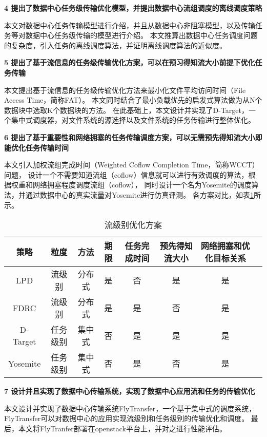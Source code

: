 \textbf{4 提出了数据中心任务级传输优化模型，并提出数据中心流组调度的离线调度策略}


本文对数据中心任务传输模型进行介绍，并且从数据中心非阻塞模型，以及传输任务等对数据中心任务级传输的模型进行介绍。
本文推算出数据中心任务调度问题的复杂度，引入任务的离线调度算法，并证明离线调度算法的近似度。


\textbf{5 提出了基于流信息的任务级传输优化方案，可以在预习得知流大小前提下优化任务传输}

本文提出基于流信息的任务级传输优化方法来最小化文件平均访问时间（File Access Time，简称FAT）。
本文同时结合了最小负载优先的启发式算法做为从N个数据块中选取K个数据块的方法。
在此基础上，本文设计并实现了D-Target，一个集中式调度器，对文件系统的源选择以及文件系统的任务传输进行整体优化。


\textbf{6 提出了基于重要性和网络拥塞的任务传输调度方案，可以无需预先得知流大小即能优化任务传输时间}


本文引入加权流组完成时间（Weighted Coflow Completion Time，简称WCCT）问题，
设计一个不需要知道流组（coflow）信息就可以进行有效调度的算法，根据权重和网络拥塞程度调度流组（coflow），
同时设计一个名为Yosemite的调度算法，并通过数据中心的真实流量对Yosemite进行仿真评测。
各方案对比，如表\ref{compare}所示。

\begin{table}[h]
\centering
\caption{流级别优化方案}\label{compare}
\renewcommand{\arraystretch}{1.5}
\begin{tabular}{|c|c|c|c|c|c|c|c|} \hline
\setlength{\tabcolsep}{10pt}
策略& 粒度 & 方法&期限&任务完成时间&预先得知流大小&网络拥塞和优化目标关系\\ \hline
LPD &流级别&分布式&是&否&是& 是\\ \hline
FDRC &流级别&分布式&是&是&否& 是\\ \hline
D-Target &任务级别&集中式&否&是&是& 是\\ \hline
Yosemite &任务级别&集中式&否&是&否& 是\\ \hline
\end{tabular}
\end{table}






\textbf{7 设计并且实现了数据中心传输系统，实现了数据中心应用流和任务的传输优化}


本文设计并实现了数据中心传输系统FlyTransfer，一个基于集中式的调度系统，
FlyTransfer可以对数据中心的应用实现流级别和任务级别的传输优化和调度。
最后，本文将FlyTranfer部署在openstack平台上，并对之进行性能评估。


